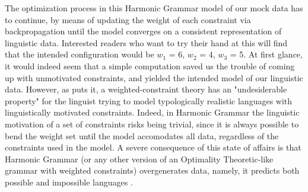 The optimization process in this Harmonic Grammar model of our mock data has to continue, by means of updating the weight of each constraint via backpropagation until the model converges on a consistent representation of linguistic data. Interested readers who want to try their hand at this will find that the intended configuration would be $w_1$ = 6, $w_2$ = 4, $w_3$ = 5. At first glance, it would indeed seem that a simple computation saved us the trouble of coming up with unmotivated constraints, and yielded the intended model of our linguistic data. However, as \textcite{kuhn2002corpus} puts it, a weighted-constraint theory has an "undesiderable property" for the linguist trying to model typologically realistic languages with linguistically motivated constraints. Indeed, in Harmonic Grammar the linguistic motivation of a set of constraints risks being trivial, since it is always possible to bend the weight set until the model accomodates all data, regardless of the constraints used in the model. A severe consequence of this state of affairs is that Harmonic Grammar (or any other version of an Optimality Theoretic-like grammar with weighted constraints) overgenerates data, namely, it predicts both possible and impossible languages \parencite{legendre2006optimality, pater2009weighted}.\\
